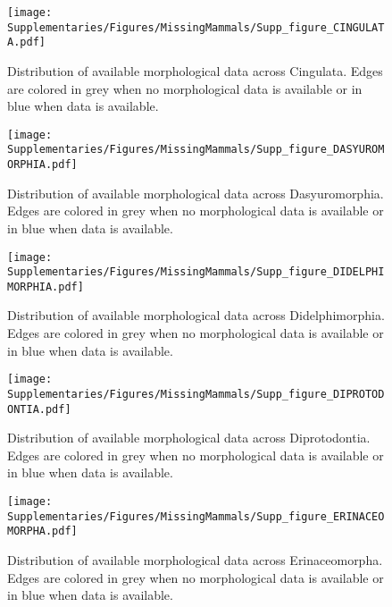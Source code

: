 \begin{figure}[!ht]
\centering
    \texttt{[image: Supplementaries/Figures/MissingMammals/Supp\_figure\_CINGULATA.pdf]}
\caption[Distribution of available morphological data across Cingulata]{Distribution of available morphological data across Cingulata. Edges are colored in grey when no morphological data is available or in blue when data is available.}
\label{Supp_Figure_Phylo-Cingulata}
\end{figure}

\begin{figure}[!ht]
\centering
    \texttt{[image: Supplementaries/Figures/MissingMammals/Supp\_figure\_DASYUROMORPHIA.pdf]}
\caption[Distribution of available morphological data across Dasyuromorphia]{Distribution of available morphological data across Dasyuromorphia. Edges are colored in grey when no morphological data is available or in blue when data is available.}
\label{Supp_Figure_Phylo-Dasyuromorphia}
\end{figure}

\begin{figure}[!ht]
\centering
    \texttt{[image: Supplementaries/Figures/MissingMammals/Supp\_figure\_DIDELPHIMORPHIA.pdf]}
\caption[Distribution of available morphological data across Didelphimorphia]{Distribution of available morphological data across Didelphimorphia. Edges are colored in grey when no morphological data is available or in blue when data is available.}
\label{Supp_Figure_Phylo-Didelphimorphia}
\end{figure}

\begin{figure}[!ht]
\centering
    \texttt{[image: Supplementaries/Figures/MissingMammals/Supp\_figure\_DIPROTODONTIA.pdf]}
\caption[Distribution of available morphological data across Diprotodontia]{Distribution of available morphological data across Diprotodontia. Edges are colored in grey when no morphological data is available or in blue when data is available.}
\label{Supp_Figure_Phylo-Diprotodontia}
\end{figure}

\begin{figure}[!ht]
\centering
    \texttt{[image: Supplementaries/Figures/MissingMammals/Supp\_figure\_ERINACEOMORPHA.pdf]}
\caption[Distribution of available morphological data across Erinaceomorpha]{Distribution of available morphological data across Erinaceomorpha. Edges are colored in grey when no morphological data is available or in blue when data is available.}
\label{Supp_Figure_Phylo-Erinaceomorpha}
\end{figure}

